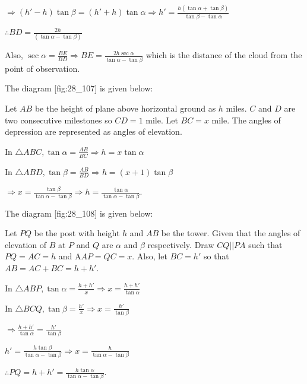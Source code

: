   $\Rightarrow (h' - h)\tan\beta = (h' + h)\tan\alpha \Rightarrow h' = \frac{h(\tan\alpha + \tan\beta)}{\tan\beta -
    \tan\alpha}$

  $\therefore BD = \frac{2h}{(\tan\alpha - \tan\beta)}$

  Also, $\sec\alpha = \frac{BE}{BD} \Rightarrow BE = \frac{2h\sec\alpha}{\tan\alpha - \tan\beta}$ which is the distance of
  the cloud from the point of observation.

\item The diagram [fig:28_107] is given below:

  \startplacefigure[reference=fig:28_107]
    \externalfigure[28_107.pdf]
  \stopplacefigure

  Let $AB$ be the height of plane above horizontal ground as $h$ miles. $C$ and $D$ are two consecutive
  milestones so $CD = 1$ mile. Let $BC = x$ mile. The angles of depression are represented as angles of elevation.

  In $\triangle ABC, \tan\alpha = \frac{AB}{BC} \Rightarrow h = x\tan\alpha$

  In $\triangle ABD, \tan\beta = \frac{AB}{BD} \Rightarrow h = (x + 1)\tan\beta$

  $\Rightarrow x = \frac{\tan\beta}{\tan\alpha - \tan\beta}\Rightarrow h = \frac{\tan\alpha}{\tan\alpha - \tan\beta}$.

\item The diagram [fig:28_108] is given below:

  \startplacefigure[reference=fig:28_108]
    \externalfigure[28_108.pdf]
  \stopplacefigure

  Let $PQ$ be the post with height $h$ and $AB$ be the tower. Given that the angles of elevation of $B$
  at $P$ and $Q$ are $\alpha$ and $\beta$ respectively. Draw $CQ||PA$ such that $PQ = AC =
  h$ and A$AP = QC = x$. Also, let $BC = h'$ so that $AB = AC + BC = h + h'$.

  In $\triangle ABP, \tan\alpha = \frac{h + h'}{x}\Rightarrow x = \frac{h + h'}{\tan\alpha}$

  In $\triangle BCQ, \tan\beta = \frac{h'}{x}\Rightarrow x = \frac{h'}{\tan\beta}$

  $\Rightarrow \frac{h + h'}{\tan\alpha} = \frac{h'}{\tan\beta}$

  $h' = \frac{h\tan\beta}{\tan\alpha - \tan\beta} \Rightarrow x = \frac{h}{\tan\alpha - \tan\beta}$

  $\therefore PQ = h + h' = \frac{h\tan\alpha}{\tan\alpha - \tan\beta}$.


